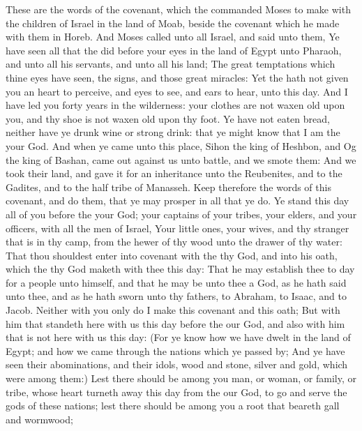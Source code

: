 \begin{biblechapter} %
 These are the words of the covenant, which the \LORD commanded Moses to make with the children of Israel in the land of Moab, beside the covenant which he made with them in Horeb.
\verse And Moses called unto all Israel, and said unto them, Ye have seen all that the \LORD did before your eyes in the land of Egypt unto Pharaoh, and unto all his servants, and unto all his land;
\verse The great temptations which thine eyes have seen, the signs, and those great miracles:
\verse Yet the \LORD hath not given you an heart to perceive, and eyes to see, and ears to hear, unto this day.
\verse And I have led you forty years in the wilderness: your clothes are not waxen old upon you, and thy shoe is not waxen old upon thy foot.
\verse Ye have not eaten bread, neither have ye drunk wine or strong drink: that ye might know that I am the \LORD your God.
\verse And when ye came unto this place, Sihon the king of Heshbon, and Og the king of Bashan, came out against us unto battle, and we smote them:
\verse And we took their land, and gave it for an inheritance unto the Reubenites, and to the Gadites, and to the half tribe of Manasseh.
\verse Keep therefore the words of this covenant, and do them, that ye may prosper in all that ye do.
\verse Ye stand this day all of you before the \LORD your God; your captains of your tribes, your elders, and your officers, with all the men of Israel,
\verse Your little ones, your wives, and thy stranger that is in thy camp, from the hewer of thy wood unto the drawer of thy water:
\verse That thou shouldest enter into covenant with the \LORD thy God, and into his oath, which the \LORD thy God maketh with thee this day:
\verse That he may establish thee to day for a people unto himself, and that he may be unto thee a God, as he hath said unto thee, and as he hath sworn unto thy fathers, to Abraham, to Isaac, and to Jacob.
\verse Neither with you only do I make this covenant and this oath;
\verse But with him that standeth here with us this day before the \LORD our God, and also with him that is not here with us this day:
\verse (For ye know how we have dwelt in the land of Egypt; and how we came through the nations which ye passed by;
\verse And ye have seen their abominations, and their idols, wood and stone, silver and gold, which were among them:)
\verse Lest there should be among you man, or woman, or family, or tribe, whose heart turneth away this day from the \LORD our God, to go and serve the gods of these nations; lest there should be among you a root that beareth gall and wormwood;

\end{biblechapter}
